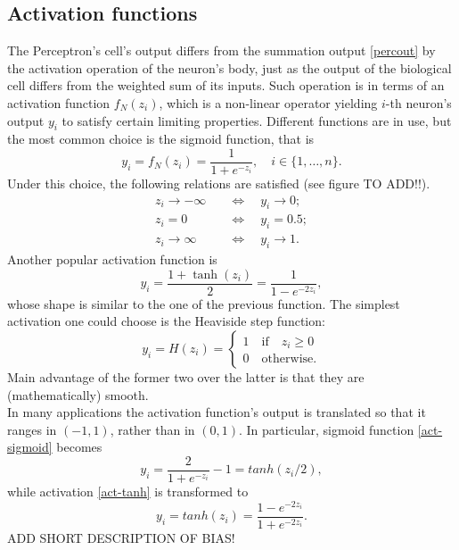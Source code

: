 \documentclass[%
    corpo=11pt,
    twoside,
    stile=classica,
    oldstyle,
    autoretitolo,
    tipotesi=magistrale,
    greek,
    evenboxes,
    english
]{toptesi}
\begin{document}
\subsection{Activation functions}
\label{percact}
The Perceptron's cell's output differs from the summation output \ref{percout} by the activation operation of the neuron's body, just as the output of the biological cell differs from the weighted sum of its inputs. Such operation is in terms of an activation function $f_N(z_i)$, which is a non-linear operator yielding $i$-th neuron's output $y_i$ to satisfy certain limiting properties. Different functions are in use, but the most common choice is the sigmoid function, that is
\begin{equation}
\label{act-sigmoid}
y_i = f_N(z_i) = \frac{1}{1 + e^{-z_i}}, \quad i \in \{1,\dots,n\}.
\end{equation}
Under this choice, the following relations are satisfied (see figure TO ADD!!).
\begin{align*}
z_i \to - \infty \quad &\Longleftrightarrow \quad y_i \to 0 ;\\
z_i = 0 \quad &\Longleftrightarrow \quad y_i = 0.5; \\
z_i \to  \infty \quad &\Longleftrightarrow \quad y_i \to 1.
\end{align*}
Another popular activation function is
\begin{equation}
\label{act-tanh}
y_i = \frac{1 + \tanh(z_i)}{2} = \frac{1}{1 - e^{-2z_i}},
\end{equation}
whose shape is similar to the one of the previous function. The simplest activation one could choose is the Heaviside step function:
\begin{equation*}
y_i = H(z_i) = \begin{cases}
1 \quad \text{if} \quad z_i \geq 0 \\
0 \quad \text{otherwise.}
\end{cases}
\end{equation*}
Main advantage of the former two over the latter is that they are (mathematically) smooth. \\
In many applications the activation function's output is translated so that it ranges in $\left(-1, 1\right)$, rather than in $\left(0, 1 \right)$. In particular, sigmoid function \eqref{act-sigmoid} becomes 
\begin{equation}
y_i = \frac{2}{1 + e^{-z_i}} -1 = tanh(z_i/2),
\end{equation}
while activation \eqref{act-tanh} is transformed to 
\begin{equation}
y_i = tanh(z_i) = \frac{1 - e^{-2z_i}}{1 + e^{-2z_i}}.
\end{equation}
ADD SHORT DESCRIPTION OF BIAS!
\end{document}
